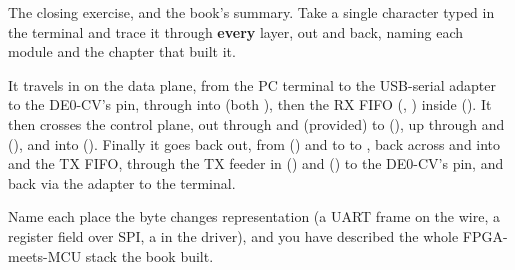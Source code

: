 \label{c10:ex:c4}
The closing exercise, and the book's summary. Take a single character typed in the terminal and
trace it through \textbf{every} layer, out and back, naming each module and the chapter that built
it.

It travels in on the data plane, from the PC terminal to the USB-serial adapter to the DE0-CV's
 pin, through  into  (both ), then the RX FIFO
(, ) inside  (). It then crosses the control plane,
out through  and  (provided) to  (), up
through  and  (), and into  ().
Finally it goes back out, from  () and  to
 to , back across  and  into
 and the TX FIFO, through the TX feeder in  () and
 () to the DE0-CV's  pin, and back via the adapter to the terminal.

Name each place the byte changes representation (a UART frame on the wire, a register field over
SPI, a  in the driver), and you have described the whole FPGA-meets-MCU stack the book
built.
